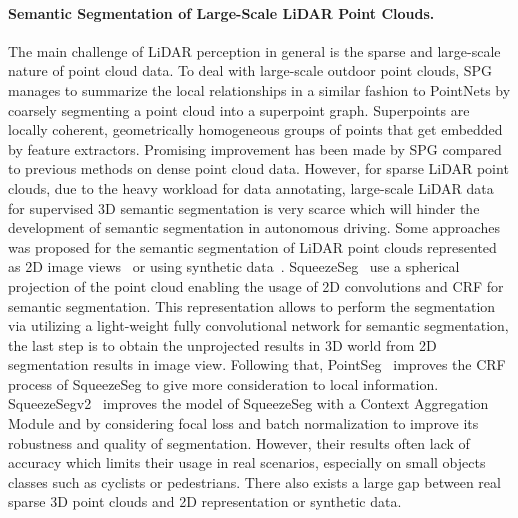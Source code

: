 \documentclass{sip}%
\begin{document}
\paragraph{Semantic Segmentation of Large-Scale LiDAR Point Clouds.}
The main challenge of LiDAR perception in general is the sparse and large-scale nature of point cloud data.
To deal with large-scale outdoor point clouds, SPG~\cite{landrieu2018large} manages to summarize the local
relationships in a similar fashion to PointNets by coarsely segmenting a point cloud into a superpoint graph. Superpoints are locally coherent, geometrically homogeneous groups of points that get embedded by feature extractors. 
Promising improvement has been made by SPG compared to previous methods on dense point cloud data.
However, for sparse LiDAR point clouds, due to the heavy workload for data annotating, large-scale LiDAR data for supervised 3D semantic segmentation is very scarce which will hinder the development of semantic segmentation in autonomous driving.
Some approaches was proposed for the semantic segmentation of LiDAR point clouds represented as 2D image views~\cite{wu2018squeezeseg,wang2018pointseg} or using synthetic data~\cite{chen2017multi,varga2017super}.
%
SqueezeSeg~\cite{wu2018squeezeseg} use a spherical projection of the point cloud enabling the usage of 2D
convolutions and CRF for semantic segmentation. 
This representation allows to perform the segmentation via utilizing a light-weight fully convolutional network for semantic segmentation, the last step is to obtain the unprojected results in 3D world from 2D segmentation results in image view.
%
Following that, PointSeg~\cite{wang2018pointseg} improves the CRF process of SqueezeSeg to give more consideration to local information.
SqueezeSegv2~\cite{wu2018squeezesegv2} improves the model of SqueezeSeg with a Context Aggregation Module and by considering focal loss and batch normalization to improve its robustness and quality of segmentation.
%
However, their results often lack of accuracy which limits their usage in real scenarios, especially on small objects classes such as cyclists or pedestrians.
There also exists a large gap between real sparse 3D point clouds and 2D representation or synthetic data.
\end{document}
